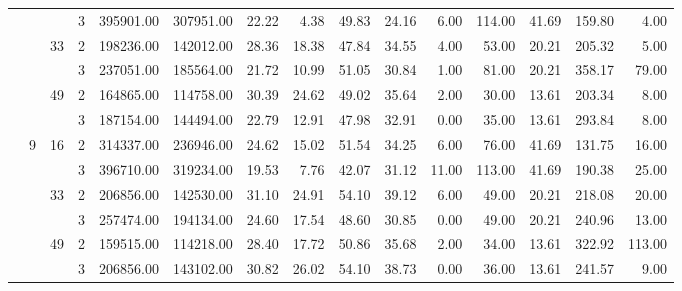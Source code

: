 \begin{tabular}{llllrrrrrrrrrrr}
                &   &    & 3 & 395901.00 & 307951.00 & 22.22 &    4.38 &   49.83 &   24.16 &    6.00 &  114.00 &   41.69 & 159.80 &     4.00 \\
\cline{3-15}
                &   & \multirow{2}{*}{33} & 2 & 198236.00 & 142012.00 & 28.36 &   18.38 &   47.84 &   34.55 &    4.00 &   53.00 &   20.21 & 205.32 &     5.00 \\
                &   &    & 3 & 237051.00 & 185564.00 & 21.72 &   10.99 &   51.05 &   30.84 &    1.00 &   81.00 &   20.21 & 358.17 &    79.00 \\
\cline{3-15}
                &   & \multirow{2}{*}{49} & 2 & 164865.00 & 114758.00 & 30.39 &   24.62 &   49.02 &   35.64 &    2.00 &   30.00 &   13.61 & 203.34 &     8.00 \\
                &   &    & 3 & 187154.00 & 144494.00 & 22.79 &   12.91 &   47.98 &   32.91 &    0.00 &   35.00 &   13.61 & 293.84 &     8.00 \\
\cline{2-15}
\cline{3-15}
                & \multirow{6}{*}{9} & \multirow{2}{*}{16} & 2 & 314337.00 & 236946.00 & 24.62 &   15.02 &   51.54 &   34.25 &    6.00 &   76.00 &   41.69 & 131.75 &    16.00 \\
                &   &    & 3 & 396710.00 & 319234.00 & 19.53 &    7.76 &   42.07 &   31.12 &   11.00 &  113.00 &   41.69 & 190.38 &    25.00 \\
\cline{3-15}
                &   & \multirow{2}{*}{33} & 2 & 206856.00 & 142530.00 & 31.10 &   24.91 &   54.10 &   39.12 &    6.00 &   49.00 &   20.21 & 218.08 &    20.00 \\
                &   &    & 3 & 257474.00 & 194134.00 & 24.60 &   17.54 &   48.60 &   30.85 &    0.00 &   49.00 &   20.21 & 240.96 &    13.00 \\
\cline{3-15}
                &   & \multirow{2}{*}{49} & 2 & 159515.00 & 114218.00 & 28.40 &   17.72 &   50.86 &   35.68 &    2.00 &   34.00 &   13.61 & 322.92 &   113.00 \\
                &   &    & 3 & 206856.00 & 143102.00 & 30.82 &   26.02 &   54.10 &   38.73 &    0.00 &   36.00 &   13.61 & 241.57 &     9.00 \\
\bottomrule
\end{tabular}
